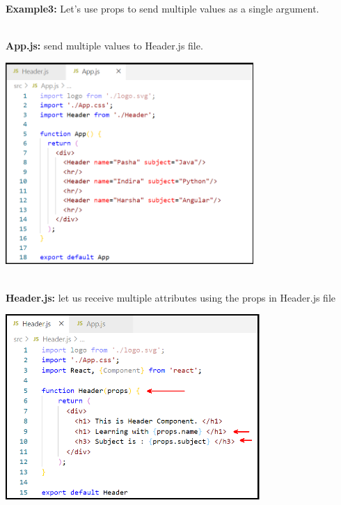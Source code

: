 \documentclass{article}
\begin{document}
\noindent 
\\
\\

\noindent \\
\textbf{Example3:} Let's use props to send multiple values as a single argument.\textbf{}

\noindent\\
 \textbf{App.js:} send multiple values to Header.js file.

\begin{center}
	\noindent \includegraphics*[width=3.71in, height=3.02in]{IMG-08-10}
\end{center}

\noindent 

\noindent \\
\textbf{Header.js: }let us receive multiple attributes using the props in Header.js file

\begin{center}
	\noindent \includegraphics*[width=3.80in, height=2.77in]{IMG-08-11}
\end{center}

\noindent 
\end{document}
